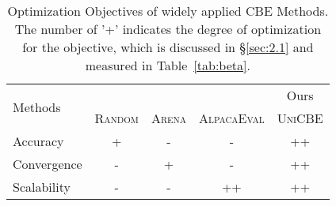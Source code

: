 \begin{table}[ht]
    \vspace{-8pt}
    \centering
    \small
    \caption{Optimization Objectives of widely applied CBE Methods. The number of '+' indicates the degree of optimization for the objective, which is discussed in \S\ref{sec:2.1} and measured in Table~\ref{tab:beta}.}
    \begin{tabular}{l c c c c}
    \toprule
       \multirow{2}{*}{Methods} & \citet{allpair} & \citet{arena} & \citet{alpacaeval} & Ours \\
&\textsc{Random}&\textsc{Arena}&\textsc{AlpacaEval}&\textsc{UniCBE} \\ \midrule
      Accuracy  & +  & - & - & ++ \\
      Convergence   & - & + & - &++\\
      Scalability & - & - &++&++\\ 
        \bottomrule
    \end{tabular}
    \label{tb:intro}
\end{table}

